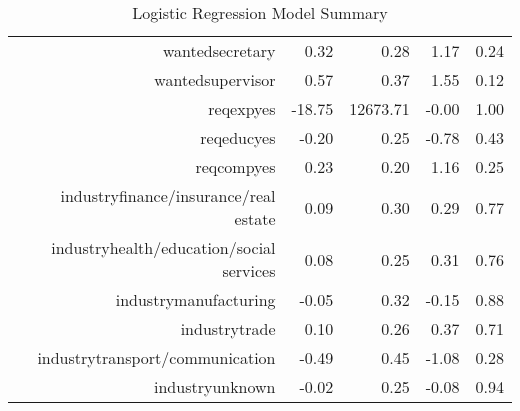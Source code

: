 \begin{table}[ht]
\begin{tabular}{rrrrr}
$$  wantedsecretary & 0.32 & 0.28 & 1.17 & 0.24 \\ 
  wantedsupervisor & 0.57 & 0.37 & 1.55 & 0.12 \\ 
  reqexpyes & -18.75 & 12673.71 & -0.00 & 1.00 \\ 
  reqeducyes & -0.20 & 0.25 & -0.78 & 0.43 \\ 
  reqcompyes & 0.23 & 0.20 & 1.16 & 0.25 \\ 
  industryfinance/insurance/real estate & 0.09 & 0.30 & 0.29 & 0.77 \\ 
  industryhealth/education/social services & 0.08 & 0.25 & 0.31 & 0.76 \\ 
  industrymanufacturing & -0.05 & 0.32 & -0.15 & 0.88 \\ 
  industrytrade & 0.10 & 0.26 & 0.37 & 0.71 \\ 
  industrytransport/communication & -0.49 & 0.45 & -1.08 & 0.28 \\ 
  industryunknown & -0.02 & 0.25 & -0.08 & 0.94 \\ 
   \hline
\end{tabular}
\caption{Logistic Regression Model Summary} 
\label{tab:Model_Summary}
\end{table}
